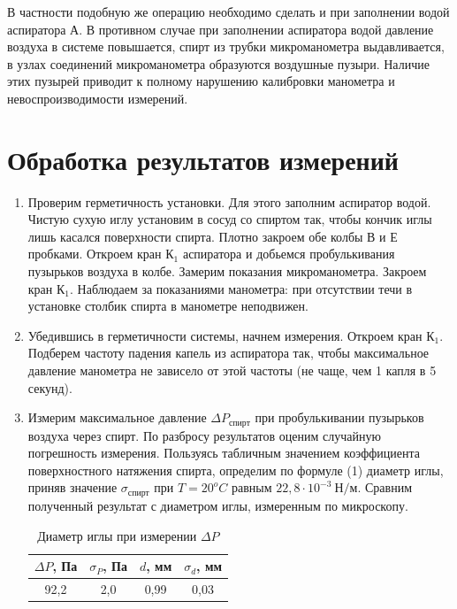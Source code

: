 \documentclass[12pt,a4paper]{article}
\begin{document}
В частности подобную же операцию необходимо сделать и при заполнении водой аспиратора А. В противном случае при заполнении аспиратора водой давление воздуха в системе повышается, спирт из трубки микроманометра выдавливается, в узлах соединений микроманометра образуются воздушные пузыри. Наличие этих пузырей приводит к полному нарушению калибровки манометра и невоспроизводимости измерений.


\section{Обработка результатов измерений}
\begin{enumerate}
    \item Проверим герметичность установки. Для этого заполним аспиратор водой. Чистую сухую иглу установим в сосуд со спиртом так, чтобы кончик иглы лишь касался поверхности спирта. Плотно закроем обе колбы В и Е пробками. Откроем кран $К_1$ аспиратора и добьемся пробулькивания пузырьков воздуха в колбе. Замерим показания микроманометра. Закроем кран $К_1$. Наблюдаем за показаниями манометра: при отсутствии течи в установке столбик спирта в манометре неподвижен. 
    
    \item Убедившись в герметичности системы, начнем измерения. Откроем кран $К_1$. Подберем частоту падения капель из аспиратора так, чтобы максимальное давление манометра не зависело от этой частоты (не чаще, чем 1 капля в 5 секунд).
    \newpage

    \item Измерим максимальное давление $\Delta P_{спирт}$ при  пробулькивании пузырьков воздуха через спирт. По разбросу результатов оценим случайную погрешность измерения. Пользуясь табличным значением коэффициента поверхностного натяжения спирта, определим по формуле (1) диаметр иглы, приняв значение $\sigma_{спирт} $ при $T=20^oC$ равным $22,8 \cdot 10^{-3}\ Н/м$. Сравним полученный результат с диаметром иглы, измеренным по микроскопу.
    
    \begin{table}[ht]
        \centering
        \begin{tabular}{|c|c|c|c|}
            \hline
            $\Delta P$, Па & $\sigma_P$, Па & $d$, мм & $\sigma_d$, мм \\
            \hline
             92,2 & 2,0 & 0,99& 0,03\\
             \hline
        \end{tabular}
        \caption{Диаметр иглы при измерении $\Delta P$}
        \label{tab:my_label}
    \end{table}


\end{enumerate}
\end{document}
